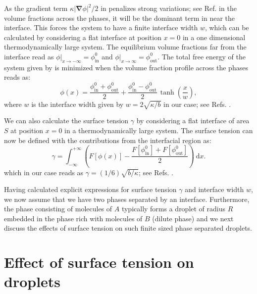As the gradient term $\kappa|\boldsymbol{\nabla} \phi|^2 / 2$ in  penalizes strong variations; see Ref. \cite{Cahn1958} in the volume fractions across the phases, it will be the dominant term in  near the interface.
This forces the system to have a finite interface width $w$, which can be calculated  by considering a flat interface at position $x= 0$ in a one dimensional thermodynamically large system.
The equilibrium volume fractions far from the interface read as $\phi|_{x \rightarrow -\infty} = \phi^0_\mathrm{in}$ and $\phi|_{x \rightarrow \infty} = \phi^0_\mathrm{out}$.
The total free energy of the system given by  is minimized when the volume fraction profile across the phases reads as:
\begin{equation*}
    \phi(x) = \frac{\phi^0_\mathrm{in} + \phi^0_\mathrm{out}}{2} + \frac{\phi^0_\mathrm{in} - \phi^0_\mathrm{out}}{2} \, \tanh{\left(\frac{x}{w} \right)},
\end{equation*}
where $w$ is the interface width given by $w = 2 \sqrt{\kappa/b}$ in our case; see Refs. \cite{Zwicker2015,Review2019}.

We can also calculate the surface tension $\gamma$ by considering a flat interface of area $S$ at position $x = 0$ in a thermodynamically large system.
The surface tension can now be defined with the contributions from the interfacial region as:
\begin{equation*}
    \gamma = \int_{-\infty}^{+ \infty} \left ( F[\phi(x)] - \frac{F[\phi^0_\mathrm{in}] + F[\phi^0_\mathrm{out}]}{2} \right)~\mathrm{d}x.
\end{equation*}
which in our case reads as $\gamma = (1/6) \sqrt{b/ \kappa}$; see Refs. \cite{Zwicker2015,Review2019}.

Having calculated explicit expressions for surface tension $\gamma$ and interface width $w$, we now assume that we have two phases separated by an interface.
Furthermore, the phase consisting of molecules of $A$ typically forms a droplet of radius $R$ embedded in the phase rich with molecules of $B$ (dilute phase) and we next discuss the effects of surface tension on such finite sized phase separated droplets.

\section{Effect of surface tension on droplets}

